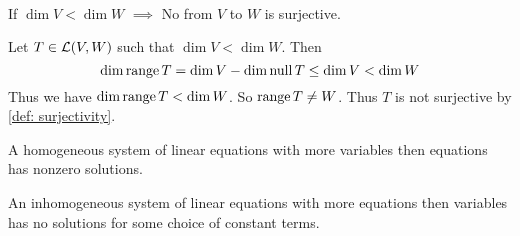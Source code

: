   \begin{thm} 
    \phantom{.}\\
    If $\dim V < \dim W$ $\implies$ No \lm from $V$ to $W$ is surjective.
  \end{thm}
  \begin{prf}
    Let $T\in \mathcal{L} (V,W)$ such that $\dim V < \dim W$. Then
    \begin{equation}
      \dim \operatorname{range} T = \dim V - \dim \operatorname{null} T \leq \dim V < \dim W
    \end{equation}
    Thus we have $\dim \operatorname{range} T < \dim W$. So $\operatorname{range} T \neq W$. Thus $T$ is not surjective by \ref{def: surjectivity}.
  \end{prf}

  \setcounter{thm}{25}
  \begin{thm} 
    A homogeneous system of linear equations with more variables then equations has nonzero solutions.
  \end{thm}

  \setcounter{thm}{27}
  \begin{thm} 
    An inhomogeneous system of linear equations with more equations then variables has no solutions for some choice of constant terms.
  \end{thm}

